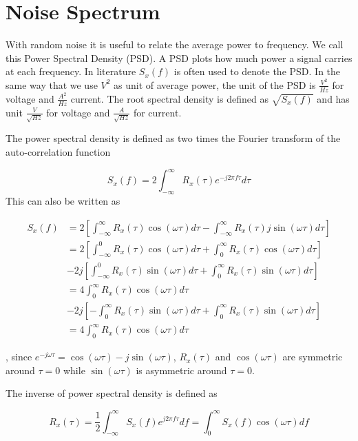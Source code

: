 \section{Noise Spectrum}\label{noise-spectrum}

With random noise it is useful to relate the average power to frequency.
We call this Power Spectral Density (PSD). A PSD plots how much power a
signal carries at each frequency. In literature \(S_x(f)\) is often used
to denote the PSD. In the same way that we use \(V^2\) as unit of
average power, the unit of the PSD is \(\frac{V^2}{Hz}\) for voltage and
\(\frac{A^2}{Hz}\) current. The root spectral density is defined as
\(\sqrt{S_x(f)}\) and has unit \(\frac{V}{\sqrt{Hz}}\) for voltage and
\(\frac{A}{\sqrt{Hz}}\) for current.

The power spectral density is defined as two times the Fourier transform
of the auto-correlation function 

\[S_x(f) = 2\int_{-\infty}^{\infty}{R_x(\tau)e^{-j2\pi f \tau}d\tau} \tag{6}\]
This can also be written as

\[\begin{aligned}
S_x(f) &= 2\left[\int_{-\infty}^{\infty}{R_x(\tau)\cos(\omega \tau)d\tau} - \int_{-\infty}^{\infty}{R_x(\tau)j\sin(\omega  \tau)d\tau}\right] \\
&= 2\left[\int_{-\infty}^{0}{R_x(\tau)\cos(\omega \tau)d\tau}
 +\int_{0}^{\infty}{R_x(\tau)\cos(\omega \tau)d\tau}\right] \\
&- 2j\left[\int_{-\infty}^{0}{R_x(\tau)\sin(\omega \tau)d\tau}
 +  \int_{0}^{\infty}{R_x(\tau)\sin(\omega \tau)d\tau} \right] \\
&= 4\int_{0}^{\infty}{R_x(\tau)\cos(\omega \tau)d\tau} \\
&- 2j\left[- \int_{0}^{\infty}{R_x(\tau)\sin(\omega \tau)d\tau} +  \int_{0}^{\infty}{R_x(\tau)\sin(\omega \tau)d\tau} \right] \\
&= 4\int_{0}^{\infty}{R_x(\tau)\cos(\omega \tau)d\tau}
\end{aligned}\]

, since \(e^{-j\omega \tau} = \cos(\omega \tau) - j \sin (\omega
  \tau)\), \(R_x(\tau)\) and \(\cos(\omega \tau)\) are symmetric around
\(\tau=0\) while \(\sin(\omega \tau)\) is asymmetric around
\(\tau = 0\).

The inverse of power spectral density is defined as

\[R_x(\tau)  = \frac{1}{2}\int_{-\infty}^{\infty}{S_x(f)e^{j 2 \pi f \tau} df} = \int_{0}^{\infty}{S_x(f) \cos(\omega \tau)df}\]

